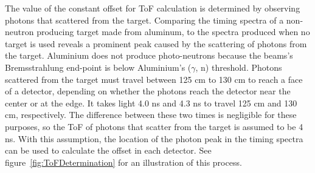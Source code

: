 The value of the constant offset for ToF calculation is determined by observing photons that scattered from the target.
Comparing the timing spectra of a non-neutron producing target made from aluminum, to the spectra produced when no target is used reveals a prominent peak caused by the scattering of photons from the target.
Aluminium does not produce photo-neutrons because the beams's Bremsstrahlung end-point is below Aluminium's ($\gamma$, n) threshold.
Photons scattered from the target must travel between 125 cm to 130 cm to reach a face of a detector, depending on whether the photons reach the detector near the center or at the edge.
It takes light 4.0 ns and 4.3 ns to travel 125 cm and 130 cm, respectively.
The difference between these two times is negligible for these purposes, so the ToF of photons that scatter from the target is assumed to be 4 ns.
With this assumption, the location of the photon peak in the timing spectra can be used to calculate the offset in each detector.
See figure~\ref{fig:ToFDetermination} for an illustration of this process.
